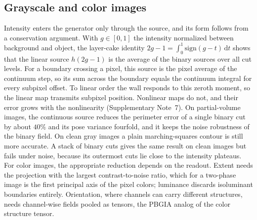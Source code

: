 \documentclass[11pt,a4paper]{article}
\newcommand{\dd}{\mathrm{d}}
\begin{document}
\subsection*{Grayscale and color images}
Intensity enters the generator only through the source, and its form follows from a conservation argument. With $g\in[0,1]$ the intensity normalized between background and object, the layer-cake identity $2g-1=\int_0^1\mathrm{sign}(g-t)\,\dd t$ shows that the linear source $h(2g-1)$ is the average of the binary sources over all cut levels. For a boundary crossing a pixel, this source is the pixel average of the continuum step, so its sum across the boundary equals the continuum integral for every subpixel offset. To linear order the wall responds to this zeroth moment, so the linear map transmits subpixel position. Nonlinear maps do not, and their error grows with the nonlinearity (Supplementary Note~7). On partial-volume images, the continuous source reduces the perimeter error of a single binary cut by about $40\%$ and its pose variance fourfold, and it keeps the noise robustness of the binary field. On clean gray images a plain marching-squares contour is still more accurate. A stack of binary cuts gives the same result on clean images but fails under noise, because its outermost cuts lie close to the intensity plateaus. For color images, the appropriate reduction depends on the readout. Extent needs the projection with the largest contrast-to-noise ratio, which for a two-phase image is the first principal axis of the pixel colors; luminance discards isoluminant boundaries entirely. Orientation, where channels can carry different structures, needs channel-wise fields pooled as tensors, the PBGIA analog of the color structure tensor\cite{DiZenzo1986}.
\end{document}
